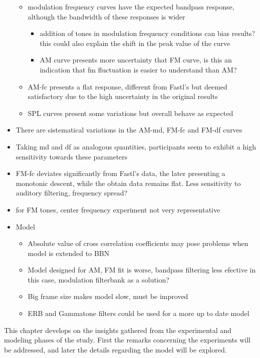 \documentclass[../main.tex]{subfiles}
\begin{document}
\begin{itemize}
\begin{itemize}
    \item modulation frequency curves have the expected bandpass response,
      although the bandwidth of these responses is wider
    \begin{itemize}
      \item addition of tones in modulation frequency conditions can bias
        results? this could also explain the shift in the peak value of the
        curve
      \item AM curve presents more uncertainty that FM curve, is this an
        indication that fm fluctuation is easier to understand than AM?
    \end{itemize}
    \item AM-fc presents a flat response, different from Fastl's but deemed
      satisfactory due to the high uncertainty in the original results
    \item SPL curves present some variations but overall behave as expected
   \end{itemize}
    \item There are sistematical variations in the AM-md, FM-fc and FM-df curves
    \item Taking md and df as analogous quantities, participants seem to exhibit
      a high sensitivity towards these parameters
    \item FM-fc deviates significantly from Fastl's data, the later presenting
      a monotonic descent, while the obtain data remains flat. Less sensitivity
      to auditory filtering, frequency spread?
    \item for FM tones, center frequency experiment not very representative
  \item Model
  \begin{itemize}
    \item Absolute value of cross correlation coefficients may pose problems
      when model is extended to BBN
    \item Model designed for AM, FM fit is worse, bandpass filtering less
      efective in this case, modulation filterbank as a solution?
    \item Big frame size makes model slow, must be improved
    \item ERB and Gammatone filters could be used for a more up to date model
  \end{itemize}
\end{itemize}

\fi

This chapter develops on the insights gathered from the experimental and
modeling phases of the study. First the remarks concerning the experiments will
be addressed, and later the details regarding the model will be explored.
\end{document}
